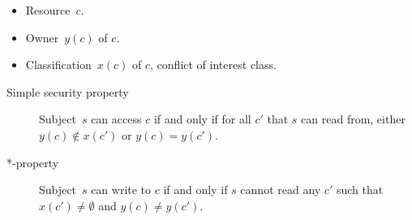 \begin{frame}
  \begin{definition}
    \begin{itemize}
      \item Resource~\(c\).
      \item Owner~\(y(c)\) of \(c\).
      \item Classification~\(x(c)\) of \(c\), conflict of interest class.
    \end{itemize}

    \begin{description}
      \item[Simple security property]
        Subject~\(s\) can access \(c\)
        if and only if
        for all \(c'\) that \(s\) can read from, either
        \(y(c)\notin x(c')\) or \(y(c) = y(c')\).

      \item[*-property] Subject~\(s\) can write to \(c\)
        if and only if
        \(s\) cannot read any \(c'\) such that \(x(c')\neq \emptyset\) and 
        \(y(c)\neq y(c')\).
    \end{description}
  \end{definition}
\end{frame}

